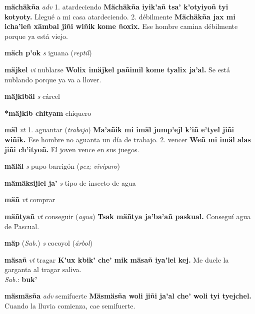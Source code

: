 \documentclass[10pt]{scrbook}
\newcommand{\entry}[1]{\textbf{#1}}
\newcommand{\onedefinition}[1]{#1.}
\newcommand{\partofspeech}[1]{\textit{#1}}
\newcommand{\spanishtranslation}[1]{#1}
\newcommand{\clarification}[1]{(\textit{#1})}
\newcommand{\cholexample}[1]{\textbf{#1}}
\newcommand{\exampletranslation}[1]{#1}
\newcommand{\dialectvariant}[1]{\\\textit{#1}:}
\newcommand{\dialectword}[1]{\textbf{#1}}
\newcommand{\relevantdialect}[1]{(\textit{#1})}
\begin{document}
\begin{multicols}{2}
\entry{mächäkña}
\partofspeech{adv}
\onedefinition{1}
\spanishtranslation{atardeciendo}
\cholexample{Mächäkña iyik'añ tsa' k'otyiyoñ tyi kotyoty.}
\exampletranslation{Llegué a mi casa atardeciendo.}
\onedefinition{2}
\spanishtranslation{débilmente}
\cholexample{Mächäkña jax mi icha'leñ xämbal jiñi wiñik kome ñoxix.}
\exampletranslation{Ese hombre camina débilmente porque ya está viejo.}

\entry{mäch p'ok}
\partofspeech{s}
\spanishtranslation{iguana}
\clarification{reptil}

\entry{mäjkel}
\partofspeech{vi}
\spanishtranslation{nublarse}
\cholexample{Wolix imäjkel pañimil kome tyalix ja'al.}
\exampletranslation{Se está nublando porque ya va a llover.}

\entry{mäjkibäl}
\partofspeech{s}
\spanishtranslation{cárcel}

\entry{*mäjkib chityam}
\spanishtranslation{chiquero}

\entry{mäl}
\partofspeech{vt}
\onedefinition{1}
\spanishtranslation{aguantar}
\clarification{trabajo}
\cholexample{Ma'añik mi imäl jump'ejl k'iñ e'tyel jiñi wiñik.}
\exampletranslation{Ese hombre no aguanta un día de trabajo.}
\onedefinition{2}
\spanishtranslation{vencer}
\cholexample{Weñ mi imäl alas jiñi ch'ityoñ.}
\exampletranslation{El joven vence en sus juegos.}

\entry{mäläl}
\partofspeech{s}
\spanishtranslation{pupo barrigón}
\clarification{pez; vivíparo}

\entry{mämäksijlel ja'}
\partofspeech{s}
\spanishtranslation{tipo de insecto de agua}

\entry{mäñ}
\partofspeech{vt}
\spanishtranslation{comprar}

\entry{mäñtyañ}
\partofspeech{vt}
\spanishtranslation{conseguir}
\clarification{agua}
\cholexample{Tsak mäñtya ja'ba'añ paskual.}
\exampletranslation{Conseguí agua de Pascual.}

\entry{mäp}
\relevantdialect{Sab.}
\partofspeech{s}
\spanishtranslation{cocoyol}
\clarification{árbol}

\entry{mäsañ}
\partofspeech{vt}
\spanishtranslation{tragar}
\cholexample{K'ux kbik' che' mik mäsañ iya'lel kej.}
\exampletranslation{Me duele la garganta al tragar saliva.}
\dialectvariant{Sab.}
\dialectword{buk'}

\entry{mäsmäsña}
\partofspeech{adv}
\spanishtranslation{semifuerte}
\cholexample{Mäsmäsña woli jiñi ja'al che' woli tyi tyejchel.}
\exampletranslation{Cuando la lluvia comienza, cae semifuerte.}


\end{multicols}
\end{document}
